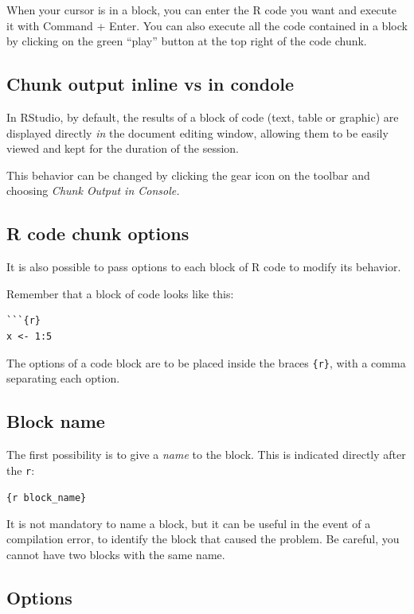 \documentclass[
  letterpaper,
  DIV=11,
  numbers=noendperiod]{scrreprt}
\begin{document}
When your cursor is in a block, you can enter the R code you want and
execute it with Command + Enter. You can also execute all the code
contained in a block by clicking on the green ``play'' button at the top
right of the code chunk.

\subsection{Chunk output inline vs in
condole}\label{chunk-output-inline-vs-in-condole}

In RStudio, by default, the results of a block of code (text, table or
graphic) are displayed directly \emph{in} the document editing window,
allowing them to be easily viewed and kept for the duration of the
session.

This behavior can be changed by clicking the gear icon on the toolbar
and choosing \emph{Chunk Output in Console.}

\subsection{R code chunk options}\label{r-code-chunk-options}

It is also possible to pass options to each block of R code to modify
its behavior.

Remember that a block of code looks like this:

\begin{verbatim}
```{r}
x <- 1:5
\end{verbatim}

The options of a code block are to be placed inside the braces
\texttt{\{r\}}, with a comma separating each option.

\subsection{Block name}\label{block-name}

The first possibility is to give a \emph{name} to the block. This is
indicated directly after the \texttt{r}:

\texttt{\{r\ block\_name\}}

It is not mandatory to name a block, but it can be useful in the event
of a compilation error, to identify the block that caused the problem.
Be careful, you cannot have two blocks with the same name.

\subsection{Options}\label{options}
\end{document}
